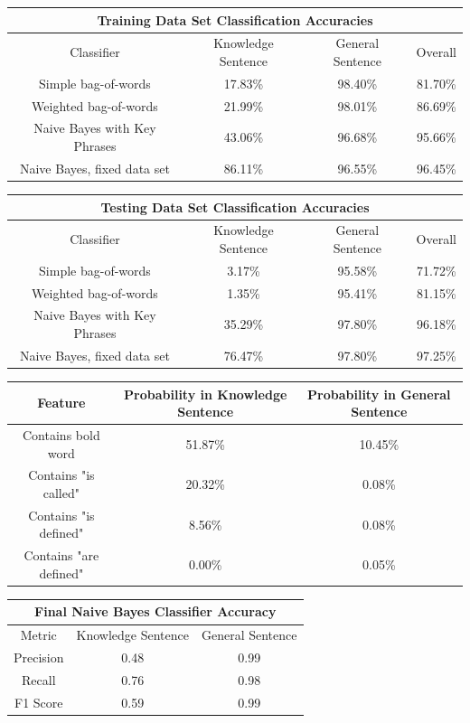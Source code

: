 \documentclass{article} %
\begin{document}
\begin{center}
 \label{tab:nb-training} 
\begin{tabular}{ |c||c|c|c| }
	\hline
	\multicolumn{4}{|c|}{Training Data Set Classification Accuracies} \\
	\hline
	Classifier & Knowledge Sentence & General Sentence & Overall \\
	\hline
	Simple bag-of-words & 17.83\% & 98.40\% & 81.70\% \\
	Weighted bag-of-words & 21.99\% & 98.01\% & 86.69\% \\
	Naive Bayes with Key Phrases & 43.06\% & 96.68\% & 95.66\% \\
	Naive Bayes, fixed data set & 86.11\% & 96.55\% & 96.45\% \\
	\hline
\end{tabular}

 \label{tab:nb-testing} 
\begin{tabular}{ |c||c|c|c| }
	\hline
	\multicolumn{4}{|c|}{Testing Data Set Classification Accuracies} \\
	\hline
	Classifier & Knowledge Sentence & General Sentence & Overall \\
	\hline
	Simple bag-of-words & 3.17\% & 95.58\% & 71.72\% \\
	Weighted bag-of-words & 1.35\% & 95.41\% & 81.15\% \\
	Naive Bayes with Key Phrases & 35.29\% & 97.80\% & 96.18\% \\
	Naive Bayes, fixed data set & 76.47\% & 97.80\% & 97.25\% \\
	\hline
\end{tabular}

 \label{tab:word-prob} 
\begin{tabular}{ |c||c|c| }
	\hline
	Feature & Probability in Knowledge Sentence & Probability in General Sentence \\
	\hline
	Contains bold word & 51.87\% & 10.45\% \\
	Contains "is called" & 20.32\% & 0.08\% \\
	Contains "is defined" & 8.56\% & 0.08\% \\
	Contains "are defined" & 0.00\% & 0.05\% \\
	\hline
\end{tabular}

 \label{tab:nbfinal-results} 
\begin{tabular}{ |c||c|c| }
	\hline
	\multicolumn{3}{|c|}{Final Naive Bayes Classifier Accuracy} \\
	\hline
	Metric & Knowledge Sentence & General Sentence \\
	\hline
	Precision & 0.48 & 0.99 \\
	Recall & 0.76 & 0.98 \\
	F1 Score & 0.59 & 0.99 \\
	\hline
\end{tabular}
\end{center}
\end{document}
